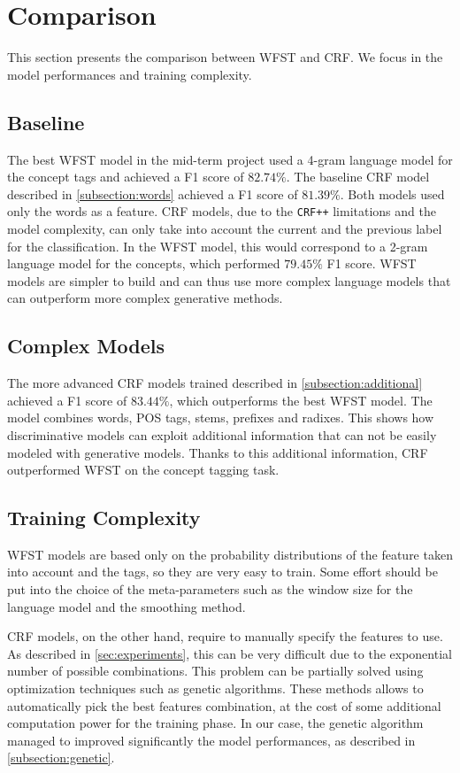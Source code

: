 \section{Comparison}
\label{sec:comparison}

This section presents the comparison between \ac{WFST} and \ac{CRF}.
We focus in the model performances and training complexity.

\subsection{Baseline}
The best \ac{WFST} model in the mid-term project used a 4-gram language model for the concept tags and achieved a F1 score of $82.74\%$.
The baseline \ac{CRF} model described in \cref{subsection:words} achieved a F1 score of $81.39\%$.
Both models used only the words as a feature.
\ac{CRF} models, due to the \texttt{CRF++} limitations and the model complexity, can only take into account the current and the previous label for the classification.
In the \ac{WFST} model, this would correspond to a 2-gram language model for the concepts, which performed $79.45\%$ F1 score.
\ac{WFST} models are simpler to build and can thus use more complex language models that can outperform more complex generative methods.

\subsection{Complex Models}
The more advanced \ac{CRF} models trained described in \cref{subsection:additional} achieved a F1 score of $83.44\%$, which outperforms the best \ac{WFST} model.
The model combines words, POS tags, stems, prefixes and radixes.
This shows how discriminative models can exploit additional information that can not be easily modeled with generative models.
Thanks to this additional information, \ac{CRF} outperformed \ac{WFST} on the concept tagging task.

\subsection{Training Complexity}
\ac{WFST} models are based only on the probability distributions of the feature taken into account and the tags, so they are very easy to train.
Some effort should be put into the choice of the meta-parameters such as the window size for the language model and the smoothing method.

\ac{CRF} models, on the other hand, require to manually specify the features to use.
As described in \cref{sec:experiments}, this can be very difficult due to the exponential number of possible combinations.
This problem can be partially solved using optimization techniques such as genetic algorithms.
These methods allows to automatically pick the best features combination, at the cost of some additional computation power for the training phase.
In our case, the genetic algorithm managed to improved significantly the model performances, as described in \cref{subsection:genetic}.
